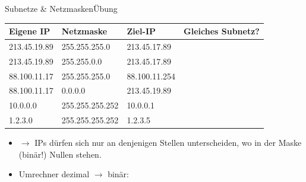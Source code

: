 \begin{frame}[fragile]{Subnetze \& Netzmasken}{Übung}
\begin{table}[H]
\centering
\footnotesize
\begin{tabular}{l|l|l|p{2cm}}

\textbf{Eigene IP} & \textbf{Netzmaske} & \textbf{Ziel-IP} & \textbf{Gleiches \newline Subnetz?} \\\midrule\midrule

213.45.19.89 & 255.255.255.0 & 213.45.17.89 &  \\\midrule

213.45.19.89 & 255.255.0.0 & 213.45.17.89 &  \\\midrule

88.100.11.17 & 255.255.255.0 & 88.100.11.254 &  \\\midrule

88.100.11.17 & 0.0.0.0 & 213.45.19.89 &  \\\midrule

10.0.0.0 & 255.255.255.252 & 10.0.0.1 & \\\midrule
1.2.3.0 & 255.255.255.252 & 1.2.3.5 & 
\end{tabular}
\end{table}
\begin{itemize}
\item $\rightarrow$ IPs dürfen sich nur an denjenigen Stellen unterscheiden, wo in der Maske (binär!) Nullen stehen. 
\item Umrechner dezimal $\rightarrow$ binär: 
\end{itemize}
\end{frame}

